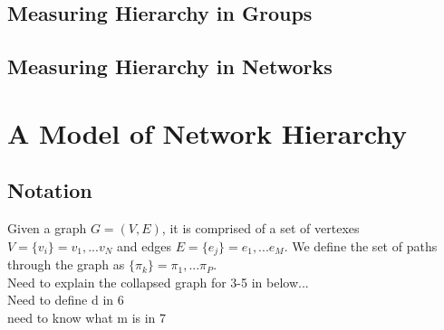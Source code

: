 \documentclass[3p,times]{elsarticle}
\begin{document}
\subsection{Measuring Hierarchy in Groups}


\subsection{Measuring Hierarchy in Networks}


\section{A Model of Network Hierarchy}

\subsection{Notation}
Given a graph $G=(V,E)$, it is comprised of a set of vertexes $V=\{v_i\}={v_1,...v_N}$ and edges $E=\{e_j\}=e_1,...e_M$. We define the set of paths through the graph as $\{\pi_{k}\}=\pi_1,...\pi_P$. \\ Need to explain the collapsed graph for 3-5 in below...\\Need to define d in 6 \\need to know what m is in 7 \\
\end{document}
